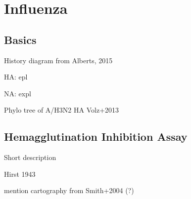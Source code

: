 
\section{Influenza}

\subsection{Basics}

History diagram from Alberts, 2015

HA: epl

NA: expl

Phylo tree of A/H3N2 HA Volz+2013

\subsection{Hemagglutination Inhibition Assay}

Short description

Hirst 1943

mention cartography from Smith+2004 (?)